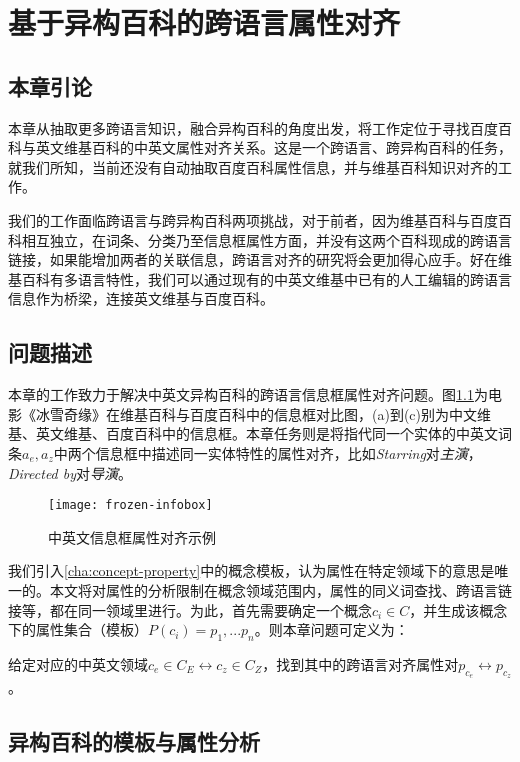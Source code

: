 \chapter{基于异构百科的跨语言属性对齐}
\label{cha:property-matching}

\section{本章引论}
本章从抽取更多跨语言知识，融合异构百科的角度出发，将工作定位于寻找百度百科与英文维基百科的中英文属性对齐关系。这是一个跨语言、跨异构百科的任务，就我们所知，当前还没有自动抽取百度百科属性信息，并与维基百科知识对齐的工作。

我们的工作面临跨语言与跨异构百科两项挑战，对于前者，因为维基百科与百度百科相互独立，在词条、分类乃至信息框属性方面，并没有这两个百科现成的跨语言链接，如果能增加两者的关联信息，跨语言对齐的研究将会更加得心应手。好在维基百科有多语言特性，我们可以通过现有的中英文维基中已有的人工编辑的跨语言信息作为桥梁，连接英文维基与百度百科。

\section{问题描述}
本章的工作致力于解决中英文异构百科的跨语言信息框属性对齐问题。图\ref{fig:frozen-infobox}为电影《冰雪奇缘》在维基百科与百度百科中的信息框对比图，(a)到(c)别为中文维基、英文维基、百度百科中的信息框。本章任务则是将指代同一个实体的中英文词条$a_e,a_z$中两个信息框中描述同一实体特性的属性对齐，比如\textit{Starring}对\textit{主演}，\textit{Directed by}对\textit{导演}。

\begin{figure}[H]
  \centering
  \texttt{[image: frozen-infobox]}
  \caption{中英文信息框属性对齐示例}
  \label{fig:frozen-infobox}
\end{figure}

我们引入\ref{cha:concept-property}中的{\heiti 概念模板}，认为属性在特定领域下的意思是唯一的。本文将对属性的分析限制在概念领域范围内，属性的同义词查找、跨语言链接等，都在同一领域里进行。为此，首先需要确定一个概念$c_i \in C$，并生成该概念下的属性集合（模板）$P(c_i)={p_1,...p_n}$。则本章问题可定义为：

给定对应的中英文领域$c_e \in C_E \leftrightarrow c_z \in C_Z$，找到其中的跨语言对齐属性对$p_{c_e} \leftrightarrow p_{c_z}$。

\section{异构百科的模板与属性分析}
\label{sec:template-property-analysis}

